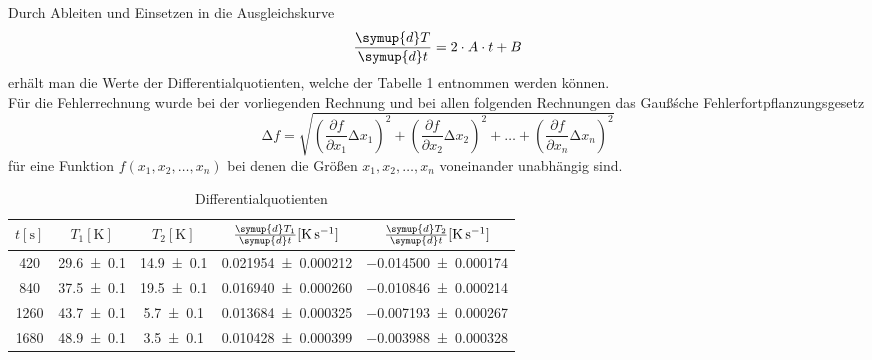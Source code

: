Durch Ableiten und Einsetzen in die Ausgleichskurve
\begin{equation}
  \frac{\symup{d}T}{\symup{d}t}= 2 \cdot A \cdot t + B
\end{equation}
erhält man die Werte der Differentialquotienten, welche der Tabelle 1 entnommen werden können.
\\
Für die Fehlerrechnung wurde bei der vorliegenden Rechnung und bei allen folgenden Rechnungen das Gauß\'sche Fehlerfortpflanzungsgesetz
\begin{equation}
\increment{f} = \sqrt{(\frac{\partial f}{\partial x_1}\increment{x_1})^2 + (\frac{\partial f}{\partial x_2}\increment{x_2})^2 + \dotsc + (\frac{\partial f}{\partial x_n}\increment{x_n})^2}
\end{equation}
für eine Funktion $f(x_1,x_2, \dotsc ,x_n)$ bei denen die Größen $x_1, x_2, \dotsc , x_n$ voneinander unabhängig sind.
\begin{table}
  \centering
  \caption{Differentialquotienten}
  \label{tab:tabelle1}
  \begin{tabular}{c c c c c}
    \toprule
    {$t [\si{\second}]$} & {$T_1 [\si{\kelvin}]$} & {$T_2 [\si{\kelvin}]$} & {$\frac{\symup{d}T_1}{\symup{d}t} [\si{\kelvin\per\second}]$}  & {$\frac{\symup{d}T_2}{\symup{d}t} [\si{\kelvin\per\second}]$}\\
    \midrule
    \num{420} & \num{29.6 +- 0.1} & \num{14.9 +- 0.1} & \num{0.021954 +- 0.000212} & \num{-0.014500 +- 0.000174} \\
    \num{840} & \num{37.5 +- 0.1} & \num{19.5 +- 0.1} & \num{0.016940 +- 0.000260} & \num{-0.010846 +- 0.000214} \\
    \num{1260} & \num{43.7 +- 0.1} & \num{5.7 +- 0.1} & \num{0.013684 +- 0.000325} & \num{-0.007193 +- 0.000267} \\
    \num{1680} & \num{48.9 +- 0.1} & \num{3.5 +- 0.1} & \num{0.010428 +- 0.000399} & \num{-0.003988 +- 0.000328} \\
    \bottomrule
  \end{tabular}
\end{table}
